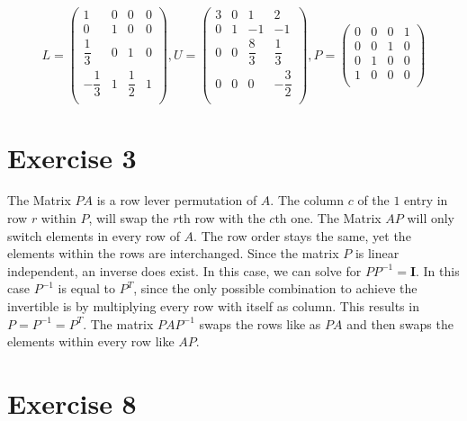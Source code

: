 \begin{equation*}
L  = \left( \begin{array}{cccc}
1 & 0 & 0 & 0\\
0 & 1 & 0 & 0\\
\dfrac{1}{3} & 0 & 1 & 0\\
-\dfrac{1}{3} & 1 & \dfrac{1}{2} & 1\\
\end{array} \right) 
,
U = \left( \begin{array}{cccc}
3 & 0 & 1 & 2\\
0 & 1 & -1 & -1\\
0 & 0 & \dfrac{8}{3} & \dfrac{1}{3}\\
0 & 0 & 0 & -\dfrac{3}{2}\\
\end{array} \right)
,
P = 
\left( \begin{array}{cccc}
0 & 0 & 0 & 1\\
0 & 0 & 1 & 0\\
0 & 1 & 0  & 0\\
1 & 0 & 0 & 0\\
\end{array} \right)
\end{equation*}

\section{Exercise 3}
The Matrix $PA$ is a row lever permutation of $A$. The column $c$ of the $1$ entry in row $r$ within $P$, will swap the $r$th row with the $c$th one.
The Matrix $AP$ will only switch elements in every row of $A$. The row order stays the same, yet the elements within the rows are interchanged.
Since the matrix $P$ is linear independent, an inverse does exist. In this case, we can solve for $PP^{-1}=\mathbf{I}$. In this case $P^{-1}$ is equal to $P^{T}$, since the only possible combination to achieve the invertible is by multiplying every row with itself as column. This results in $P = P^{-1} = P^{T}$.
The matrix $PAP^{-1}$ swaps the rows like as $PA$ and then swaps the elements within every row like $AP$.

\section{Exercise 8}

